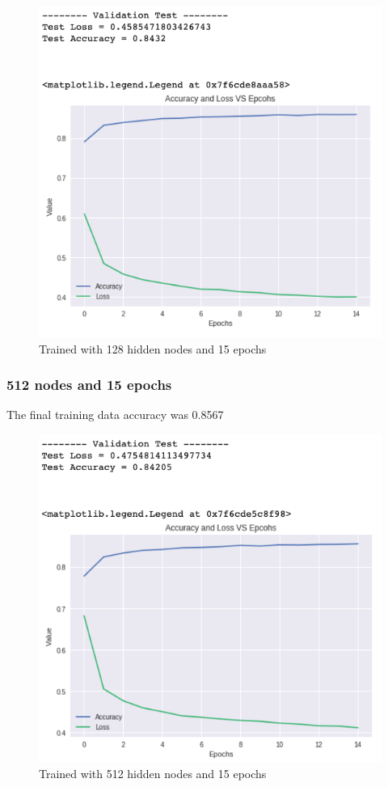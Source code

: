 \documentclass[a4paper, 12pt]{article}
\begin{document}
    \begin{figure}[h!]
        \centering
        \captionsetup{justification=centering}
        \includegraphics[scale = 0.37]{128_15.png}
        \caption{Trained with 128 hidden nodes and 15 epochs}
    \end{figure}

    \subsubsection{512 nodes and 15 epochs}

    The final training data accuracy was 0.8567
    
    \begin{figure}[h!]
        \centering
        \captionsetup{justification=centering}
        \includegraphics[scale = 0.37]{512_15.png}
        \caption{Trained with 512 hidden nodes and 15 epochs}
    \end{figure}
\end{document}

